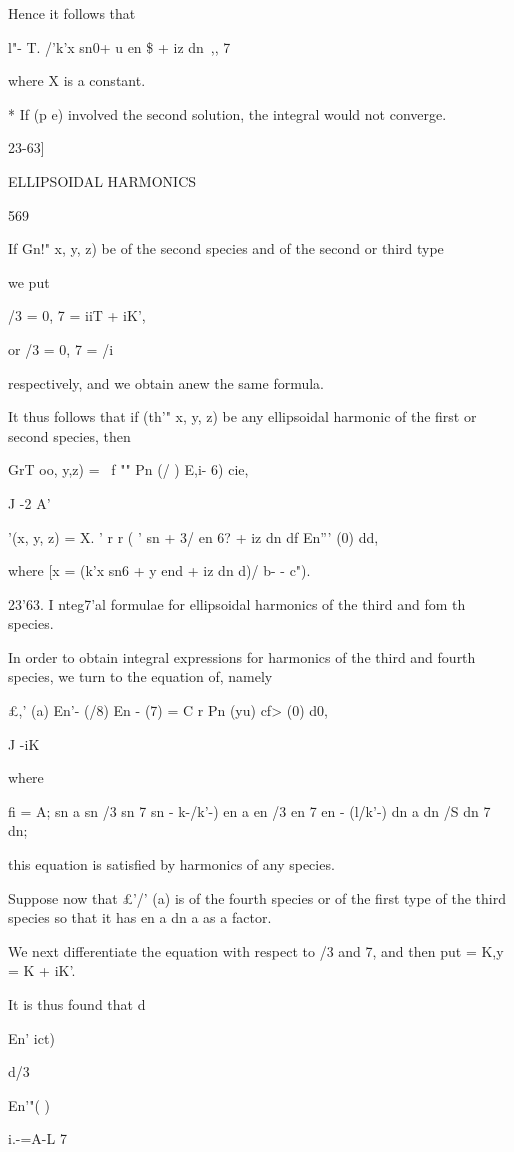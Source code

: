 {{{{{{{{Hence it follows that

l"- T. /'k'x sn0+ u en \$ + iz dn \,,, 7

where X is a constant.

* If (p e) involved the second solution, the integral would not
converge.

23-63]

ELLIPSOIDAL HARMONICS

569

If Gn!" x, y, z) be of the second species and of the second or third
type

we put

/3 = 0, 7 = iiT + iK',

or /3 = 0, 7 = /i

respectively, and we obtain anew the same formula.

It thus follows that if (th'" x, y, z) be any ellipsoidal harmonic of
the first or second species, then

GrT oo, y,z) = \ f "" Pn (/ ) E,i- 6) cie,

J -2 A'

  '(x, y, z) = X. ' r r ( ' sn + 3/ en 6? + iz dn df En''' (0) dd,

where [x = (k'x sn6 + y end + iz dn d)/\/ b- - c").

23'63. I nteg7'al formulae for ellipsoidal harmonics of the third and
fom th species.

In order to obtain integral expressions for harmonics of the third and
fourth species, we turn to the equation of, namely

£,' (a) En'- (/8) En - (7) = C r Pn (yu) cf> (0) d0,

J -iK

where

fi = A; sn a sn /3 sn 7 sn - k-/k'-) en a en /3 en 7 en - (l/k'-) dn a
dn /S dn 7 dn;

this equation is satisfied by harmonics of any species.

Suppose now that £'/' (a) is of the fourth species or of the first
type of the third species so that it has en a dn a as a factor.

We next differentiate the equation with respect to /3 and 7, and then
put = K,y = K + iK'.

It is thus found that d

En' ict)

d/3

En'"( )

i.-=A-L 7

}}}}}}}}
